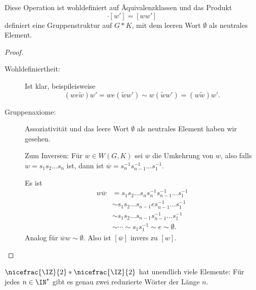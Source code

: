 \documentclass[language=ngerman]{TemplateLecture} %
\begin{document}
\begin{prop}
    Diese Operation ist wohldefiniert auf Äquivalenzklassen und das Produkt 
    \begin{equation*}
        [w] \cdot [w'] = [w w']
    \end{equation*}
    definiert eine Gruppenstruktur auf $G * K$, mit dem leeren Wort $\emptyset$ als neutrales Element.
\end{prop}

\begin{proof}
    \begin{description}
        \item[Wohldefiniertheit:] Ist klar, beispileisweise 
        \begin{equation*}
            (w e \tilde{w})w' = w e(\tilde{w} w') \sim w(\tilde{w} w') = (w \tilde{w}) w'.
        \end{equation*}
        \item[Gruppenaxiome:] Assoziativität und das leere Wort $\emptyset$ als neutrales Element haben wir gesehen.
        
        Zum Inversen: Für $w \in W(G,K)$ sei $\overline{w}$ die Umkehrung von $w$, also falls $w = s_1 s_2 \ldots s_n$ ist, dann ist $\overline{w} = s_n^{-1} s_{n-1}^{-1} \ldots s_1^{-1}$.

        Es ist
        \begin{equation*}
            \begin{split}
                w \overline{w} &= s_1 s_2 \ldots s_n s_n^{-1} s_{n-1}^{-1} \ldots s_1^{-1} \\
                &\sim s_1 s_2 \ldots s_{n-1} e s_{n-1}^{-1} \ldots s_1^{-1} \\
                &\sim s_1 s_2 \ldots s_{n-1} s_{n-1}^{-1} \ldots s_1^{-1} \\
                &\sim \cdots \sim s_1 s_1^{-1} \sim e \sim \emptyset. 
            \end{split}
        \end{equation*}
        Analog für $\overline{w} w \sim \emptyset$. Also ist $[\overline{w}]$ invers zu $[w]$.
    \end{description}
\end{proof}

\begin{example}
    $\nicefrac{\IZ}{2} * \nicefrac{\IZ}{2}$ hat unendlich viele Elemente: Für jedes $n \in \IN^*$ gibt es genau zwei reduzierte Wörter der Länge $n$.
\end{example}
\end{document}
